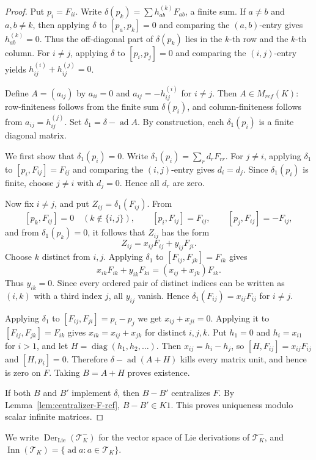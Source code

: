 \documentclass[11pt]{article}
\numberwithin{equation}{section}
\theoremstyle{plain}
\theoremstyle{definition}
\numberwithin{equation}{section}
\newcommand{\T}{\mathscr T_K}
\begin{document}
\begin{proof}
Put $p_i=F_{ii}$. Write $\delta(p_k)=\sum h^{(k)}_{ab}F_{ab}$, a finite sum. If $a\neq b$ and $a,b\neq k$, then applying $\delta$ to $[p_a,p_k]=0$ and comparing the $(a,b)$-entry gives $h^{(k)}_{ab}=0$. Thus the off-diagonal part of $\delta(p_k)$ lies in the $k$-th row and the $k$-th column. For $i\neq j$, applying $\delta$ to $[p_i,p_j]=0$ and comparing the $(i,j)$-entry yields $h^{(i)}_{ij}+h^{(j)}_{ij}=0$.

Define $A=(a_{ij})$ by $a_{ii}=0$ and $a_{ij}=-h^{(i)}_{ij}$ for $i\neq j$. Then $A\in M_{rcf}(K)$: row-finiteness follows from the finite sum $\delta(p_i)$, and column-finiteness follows from $a_{ij}=h^{(j)}_{ij}$. Set $\delta_1=\delta-\operatorname{ad}A$. By construction, each $\delta_1(p_i)$ is a finite diagonal matrix.

We first show that $\delta_1(p_i)=0$. Write $\delta_1(p_i)=\sum_r d_rF_{rr}$. For $j\neq i$, applying $\delta_1$ to $[p_i,F_{ij}]=F_{ij}$ and comparing the $(i,j)$-entry gives $d_i=d_j$. Since $\delta_1(p_i)$ is finite, choose $j\neq i$ with $d_j=0$. Hence all $d_r$ are zero.

Now fix $i\neq j$, and put $Z_{ij}=\delta_1(F_{ij})$. From
$$
[p_k,F_{ij}]=0\quad(k\notin\{i,j\}),\qquad
[p_i,F_{ij}]=F_{ij},\qquad
[p_j,F_{ij}]=-F_{ij},
$$
and from $\delta_1(p_k)=0$, it follows that $Z_{ij}$ has the form
$$
Z_{ij}=x_{ij}F_{ij}+y_{ij}F_{ji}.
$$
Choose $k$ distinct from $i,j$. Applying $\delta_1$ to $[F_{ij},F_{jk}]=F_{ik}$ gives
$$
x_{ik}F_{ik}+y_{ik}F_{ki}=(x_{ij}+x_{jk})F_{ik}.
$$
Thus $y_{ik}=0$. Since every ordered pair of distinct indices can be written as $(i,k)$ with a third index $j$, all $y_{ij}$ vanish. Hence $\delta_1(F_{ij})=x_{ij}F_{ij}$ for $i\neq j$.

Applying $\delta_1$ to $[F_{ij},F_{ji}]=p_i-p_j$ we get $x_{ij}+x_{ji}=0$. Applying it to $[F_{ij},F_{jk}]=F_{ik}$ gives $x_{ik}=x_{ij}+x_{jk}$ for distinct $i,j,k$. Put $h_1=0$ and $h_i=x_{i1}$ for $i>1$, and let $H=\operatorname{diag}(h_1,h_2,\ldots)$. Then $x_{ij}=h_i-h_j$, so $[H,F_{ij}]=x_{ij}F_{ij}$ and $[H,p_i]=0$. Therefore $\delta-\operatorname{ad}(A+H)$ kills every matrix unit, and hence is zero on $F$. Taking $B=A+H$ proves existence.

If both $B$ and $B'$ implement $\delta$, then $B-B'$ centralizes $F$. By Lemma~\ref{lem:centralizer-F-rcf}, $B-B'\in K1$. This proves uniqueness modulo scalar infinite matrices.
\end{proof}

We write $\operatorname{Der}_{\mathrm{Lie}}(\T^-)$ for the vector space of Lie derivations of $\T^-$, and $\operatorname{Inn}(\T)=\{\operatorname{ad}a:a\in\T\}$.
\end{document}
